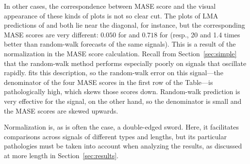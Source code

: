 In other cases, the correspondence between MASE score and the visual
appearance of these kinds of plots is not so clear cut.  The plots of
LMA predictions of \col and \svdfive both lie near the diagonal, for
instance, but the corresponding MASE scores are very different:
$0.050$ for \col and $0.718$ for \svdfive (resp., 20 and 1.4 times
better than random-walk forecasts of the same signals).  This is a
result of the normalization in the MASE score calculation.  Recall
from Section~\ref{sec:simple} that the random-walk method performs
especially poorly on signals that oscillate rapidly.  \col fits this
description, so the random-walk error on this signal---the denominator
of the four MASE scores in the first row of the Table---is
pathologically high, which skews those scores down.  Random-walk
prediction is very effective for the \svdfive signal, on the other
hand, so the denominator is small and the MASE scores are skewed
upwards.

Normalization is, as is often the case, a double-edged sword.  Here,
it facilitates comparisons across signals of different types and
lengths, but its particular pathologies must be taken into account
when analyzing the results, as discussed at more length in
Section~\ref{sec:results}.




